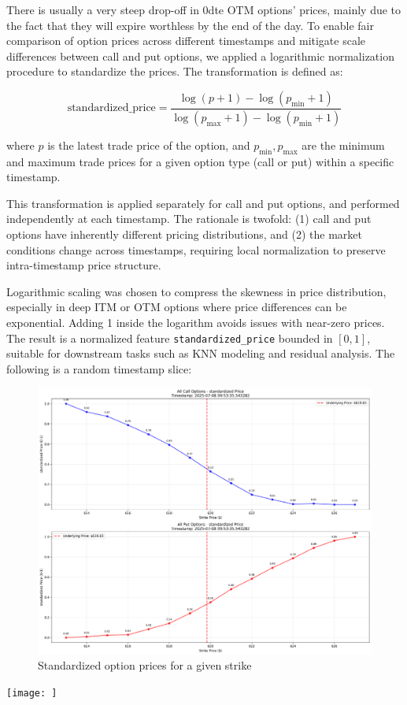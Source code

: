 \documentclass{article}
\begin{document}
There is usually a very steep drop-off in 0dte OTM options' prices, mainly due to the fact that they will expire worthless by the end of the day. To enable fair comparison of option prices across different timestamps and mitigate scale differences between call and put options, we applied a logarithmic normalization procedure to standardize the prices. The transformation is defined as:

\[
\text{standardized\_price} = \frac{\log(p + 1) - \log(p_{\min} + 1)}{\log(p_{\max} + 1) - \log(p_{\min} + 1)}
\]

where \(p\) is the latest trade price of the option, and \(p_{\min}, p_{\max}\) are the minimum and maximum trade prices for a given option type (call or put) within a specific timestamp.

This transformation is applied separately for call and put options, and performed independently at each timestamp. The rationale is twofold: (1) call and put options have inherently different pricing distributions, and (2) the market conditions change across timestamps, requiring local normalization to preserve intra-timestamp price structure. 

Logarithmic scaling was chosen to compress the skewness in price distribution, especially in deep ITM or OTM options where price differences can be exponential. Adding 1 inside the logarithm avoids issues with near-zero prices. The result is a normalized feature \texttt{standardized\_price} bounded in \([0, 1]\), suitable for downstream tasks such as KNN modeling and residual analysis. The following is a random timestamp slice:
\begin{figure}[h]
  \centering
  \includegraphics[width=0.8\linewidth]{calls_puts_timestamp_329}
  \caption{Standardized option prices for a given strike}
  \label{fig:price-std}
\end{figure}
\texttt{[image: ]}
\end{document}
